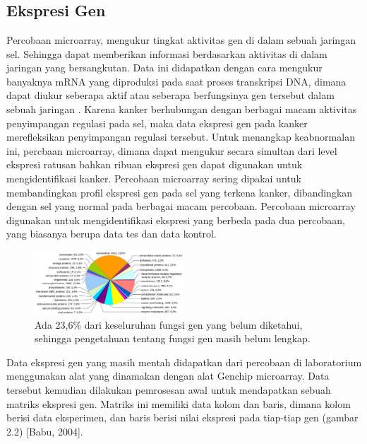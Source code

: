\chapter{\babDua}

\section{Ekspresi Gen}
Percobaan microarray, mengukur tingkat aktivitas gen di dalam sebuah jaringan sel. Sehingga dapat memberikan informasi berdasarkan aktivitas di dalam jaringan yang bersangkutan. Data ini didapatkan dengan cara mengukur banyaknya mRNA yang diproduksi pada saat proses transkripsi DNA, dimana dapat diukur seberapa aktif atau seberapa berfungsinya gen tersebut dalam sebuah jaringan \citep{elloumi2011algorithms}. Karena kanker berhubungan dengan berbagai macam aktivitas penyimpangan regulasi pada sel, maka data ekspresi gen pada kanker merefleksikan penyimpangan regulasi tersebut. Untuk menangkap keabnormalan ini, percbaan microarray, dimana dapat mengukur secara simultan dari level ekspresi ratusan bahkan ribuan ekspresi gen dapat digunakan untuk mengidentifikasi kanker. Percobaan microarray sering dipakai untuk membandingkan profil ekspresi gen pada sel yang terkena kanker, dibandingkan dengan sel yang normal pada berbagai macam percobaan. Percobaan microarray digunakan untuk mengidentifikasi ekspresi yang berbeda pada dua percobaan, yang biasanya berupa data tes dan data kontrol.\\
\begin{figure}
	\centering
	\includegraphics[width=0.50\textwidth]
		{pics/gbr2_1.png}
	\caption{Ada 23,6\% dari keseluruhan fungsi gen yang belum diketahui, sehingga pengetahuan tentang fungsi gen masih belum lengkap. \citep{haggstrom2014diagram}}
	\label{fig:gbr2.1}
\end{figure}

Data ekspresi gen yang masih mentah didapatkan dari percobaan di laboratorium menggunakan alat yang dinamakan dengan alat Genchip microarray. Data tersebut kemudian dilakukan pemrosesan awal untuk mendapatkan sebuah matriks ekspresi gen. Matriks ini memiliki data kolom dan baris, dimana kolom berisi data eksperimen, dan baris berisi nilai ekspresi pada tiap-tiap gen (gambar 2.2) [Babu, 2004].

